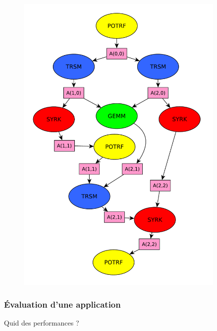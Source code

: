 \documentclass[xcolor={usenames,dvipsnames,svgnames,table}, aspectratio=43]{beamer}
\begin{document}
\begin{frame}[fragile]
\begin{minipage}[t]{0.46\linewidth}
\begin{figure}
{    \includegraphics[width=0.9\textwidth]{graph/cholesky-dag-3-data.pdf}%
  }%
\end{figure}
\end{minipage}


\end{frame}

\begin{frame}
  \frametitle{Évaluation d'une application}

  \centering
  Quid des performances ?
\end{frame}
\end{document}
